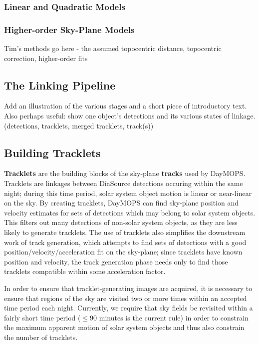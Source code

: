 \documentclass[12pt,preprint]{aastex}
\begin{document}
\subsubsection{Linear and Quadratic Models}

\subsubsection{Higher-order Sky-Plane Models}
Tim's methods go here - the assumed topocentric distance, topocentric correction, higher-order fits

\subsection{The Linking Pipeline}
Add an illustration of the various stages and a short piece of
introductory text.  Also perhaps useful: show one object's detections
and its various states of linkage. (detections, tracklets, merged tracklets, track(s))

\subsection{Building Tracklets}


\textbf{Tracklets} are the building blocks of the sky-plane
\textbf{tracks} used by DayMOPS.  Tracklets are linkages between
DiaSource detections occuring within the same night; during this time
period, solar system object motion is linear or near-linear on the
sky. By creating tracklets, DayMOPS can find sky-plane position and
velocity estimates for sets of detections which may belong to solar
system objects.  This filters out many detections of non-solar system
objects, as they are less likely to generate tracklets.  The use of
tracklets also simplifies the downstream work of track generation,
which attempts to find sets of detections with a good
position/velocity/acceleration fit on the sky-plane; since tracklets
have known position and velocity, the track generation phase needs
only to find those tracklets compatible within some acceleration
factor.

In order to ensure that tracklet-generating images are acquired, it is
necessary to ensure that regions of the sky are visited two or more
times within an accepted time period each night.  Currently, we
require that sky fields be revisited within a fairly short time period
($\leq 90$ minutes is the current rule) in order to constrain the
maximum apparent motion of solar system objects and thus also
constrain the number of tracklets.
\end{document}
